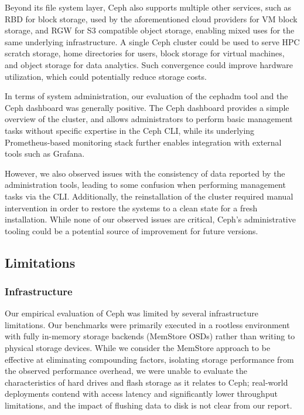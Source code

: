 Beyond its file system layer, Ceph also supports multiple other services, such as \ac{RBD} for block storage, used by the aforementioned cloud providers for \ac{VM} block storage, and \ac{RGW} for \ac{S3} compatible object storage, enabling mixed uses for the same underlying infrastructure. A single Ceph cluster could be used to serve \ac{HPC} scratch storage, home directories for users, block storage for virtual machines, and object storage for data analytics. Such convergence could improve hardware utilization, which could potentially reduce storage costs.

In terms of system administration, our evaluation of the cephadm tool and the Ceph dashboard was generally positive. The Ceph dashboard provides a simple overview of the cluster, and allows administrators to perform basic management tasks without specific expertise in the Ceph \ac{CLI}, while its underlying Prometheus-based monitoring stack further enables integration with external tools such as Grafana. 

However, we also observed issues with the consistency of data reported by the administration tools, leading to some confusion when performing management tasks via the \ac{CLI}. Additionally, the reinstallation of the cluster required manual intervention in order to restore the systems to a clean state for a fresh installation. While none of our observed issues are critical, Ceph's administrative tooling could be a potential source of improvement for future versions.

\subsection{Limitations}

\subsubsection{Infrastructure}
\label{sec:infrastructure-limitations}

Our empirical evaluation of Ceph was limited by several infrastructure limitations. Our benchmarks were primarily executed in a rootless environment with fully in-memory storage backends (MemStore \acp{OSD}) rather than writing to physical storage devices. While we consider the MemStore approach to be effective at eliminating compounding factors, isolating storage performance from the observed performance overhead, we were unable to evaluate the characteristics of hard drives and flash storage as it relates to Ceph; real-world deployments contend with access latency and significantly lower throughput limitations, and the impact of flushing data to disk is not clear from our report.


